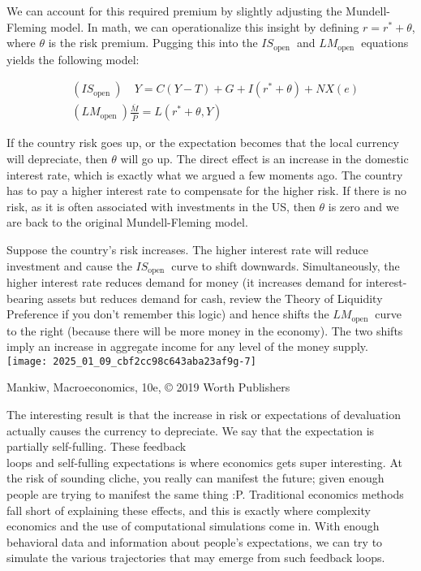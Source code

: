 \documentclass[10pt]{article}
\begin{document}
We can account for this required premium by slightly adjusting the Mundell-Fleming model. In math, we can operationalize this insight by defining $r=r^{*}+\theta$, where $\theta$ is the risk premium. Pugging this into the $I S_{\text {open }}$ and $L M_{\text {open }}$ equations yields the following model:

$$
\begin{aligned}
& \left(I S_{\text {open }}\right) \quad Y=C(Y-T)+G+I\left(r^{*}+\theta\right)+N X(e) \\
& \left(L M_{\text {open }}\right) \frac{\bar{M}}{\bar{P}}=L\left(r^{*}+\theta, Y\right)
\end{aligned}
$$

If the country risk goes up, or the expectation becomes that the local currency will depreciate, then $\theta$ will go up. The direct effect is an increase in the domestic interest rate, which is exactly what we argued a few moments ago. The country has to pay a higher interest rate to compensate for the higher risk. If there is no risk, as it is often associated with investments in the US, then $\theta$ is zero and we are back to the original Mundell-Fleming model.

Suppose the country's risk increases. The higher interest rate will reduce investment and cause the $I S_{\text {open }}$ curve to shift downwards. Simultaneously, the higher interest rate reduces demand for money (it increases demand for interest-bearing assets but reduces demand for cash, review the Theory of Liquidity Preference if you don't remember this logic) and hence shifts the $L M_{\text {open }}$ curve to the right (because there will be more money in the economy). The two shifts imply an increase in aggregate income for any level of the money supply.\\
\texttt{[image: 2025\_01\_09\_cbf2cc98c643aba23af9g-7]}

Mankiw, Macroeconomics, 10e, © 2019 Worth Publishers

The interesting result is that the increase in risk or expectations of devaluation actually causes the currency to depreciate. We say that the expectation is partially self-fulling. These feedback\\
loops and self-fulling expectations is where economics gets super interesting. At the risk of sounding cliche, you really can manifest the future; given enough people are trying to manifest the same thing :P. Traditional economics methods fall short of explaining these effects, and this is exactly where complexity economics and the use of computational simulations come in. With enough behavioral data and information about people's expectations, we can try to simulate the various trajectories that may emerge from such feedback loops.
\end{document}
